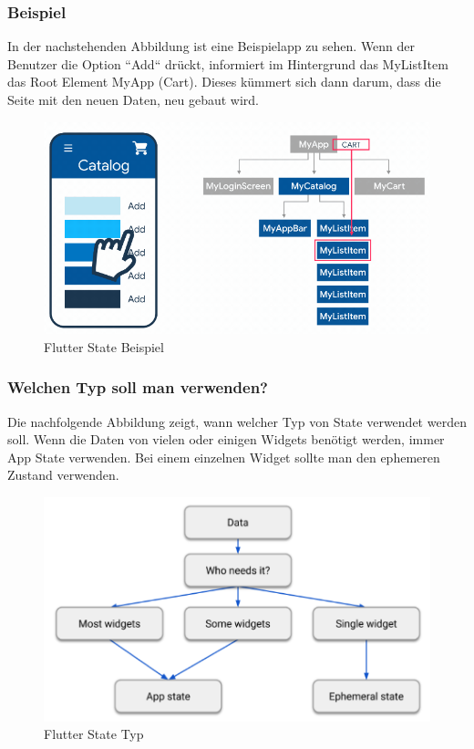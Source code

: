 \subsubsection{Beispiel}
In der nachstehenden Abbildung ist eine Beispielapp zu sehen. Wenn der Benutzer die Option ``Add`` drückt, informiert im Hintergrund das MyListItem das Root Element MyApp (Cart). Dieses kümmert sich dann darum, dass die Seite mit den neuen Daten, neu gebaut wird.

\begin{figure}[h!]
\centering
\includegraphics[width=1\textwidth]{FLUTTER/images/ZB/state_example.png}
\caption{Flutter State Beispiel \cite{Flutter-State-Example}}
\end{figure}

\newpage

\subsubsection{Welchen Typ soll man verwenden?}
Die nachfolgende Abbildung zeigt, wann welcher Typ von State verwendet werden soll. Wenn die Daten von vielen oder einigen Widgets benötigt werden, immer App State verwenden. Bei einem einzelnen Widget sollte man den ephemeren Zustand verwenden.

\begin{figure}[h!]
\centering
\includegraphics[width=1.0\textwidth]{FLUTTER/images/ZB/which_state.png}
\caption{Flutter State Typ \cite{Flutter-State-Type}}
\end{figure}

